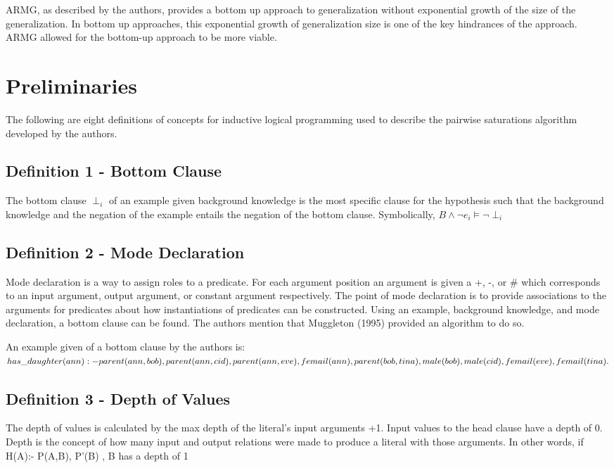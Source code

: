\documentclass[jair,twoside,11pt,theapa]{article}
\begin{document}
ARMG, as described by the authors, provides a bottom up approach to generalization without exponential growth of the size of the generalization. In bottom up approaches, this exponential growth of generalization size is one of the key hindrances of the approach. ARMG allowed for the bottom-up approach to be more viable. 




\section{Preliminaries}
\label{preliminaries}
The following are eight definitions of concepts for inductive logical programming used to describe the pairwise saturations algorithm developed by the authors.

\subsection{Definition 1 - Bottom Clause}
The bottom clause $\perp_i$ of an example given background knowledge is the most specific clause for the hypothesis such that the background knowledge and the negation of the example entails the negation of the bottom clause. Symbolically, $B \wedge \neg e_i \vDash \neg \perp_i$

\subsection{Definition 2 - Mode Declaration}
Mode declaration is a way to assign roles to a predicate. For each argument position an argument is given a +, -, or \# which corresponds to an input argument, output argument, or constant argument respectively. The point of mode declaration is to provide associations to the arguments for predicates about how instantiations of predicates can be constructed. Using an example, background knowledge, and mode declaration, a bottom clause can be found. The authors mention that Muggleton (1995) provided an algorithm to do so. 

An example given of a bottom clause by the authors is: \\
$has\_daughter(ann) :- parent(ann, bob), parent(ann, cid), parent(ann, eve), \\
femail(ann), parent(bob, tina), male(bob), male(cid), femail(eve), femail(tina).$ 

\subsection{Definition 3 - Depth of Values}
The depth of values is calculated by the max depth of the literal's input arguments +1. Input values to the head clause have a depth of 0. Depth is the concept of how many input and output relations were made to produce a literal with those arguments. In other words, if H(A):- P(A,B), P'(B) , B has a depth of 1
\end{document}
